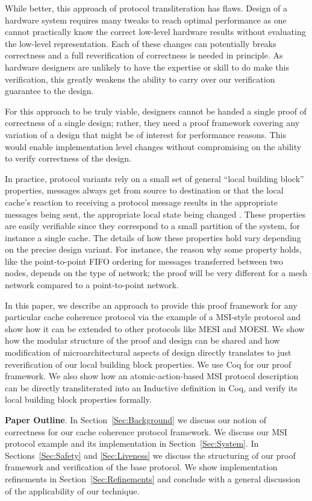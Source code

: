 While better, this approach of protocol transliteration has
flaws. Design of a hardware system requires many tweaks to reach
optimal performance as one cannot practically know the correct
low-level hardware results without evaluating the low-level
representation.  Each of these changes can potentially breaks
correctness and a full reverification of correctness is needed in
principle. As hardware designers are unlikely to have the expertise or
skill to do make this verification, this greatly weakens the ability
to carry over our verification guarantee to the design.

For this approach to be truly viable, designers cannot be handed a
single proof of correctness of a single design; rather, they need a
proof framework covering any variation of a design that might be of
interest for performance reasons. This would enable implementation
level changes without compromising on the ability to verify
correctness of the design.

In practice, protocol variants rely on a small set of general ``local
building block'' properties, \eg{} messages always get from source to
destination or that the local cache's reaction to receiving a protocol
message results in the appropriate messages being sent, the
appropriate local state being changed \etc{}.  These properties are
easily verifiable since they correspond to a small partition of the
system, for instance a single cache.  The details of how these
properties hold vary depending on the precise design variant. For
instance, the reason why some property holds, like the point-to-point
FIFO ordering for messages transferred between two nodes, depends on
the type of network; the proof will be very different for a mesh
network compared to a point-to-point network.

In this paper, we describe an approach to provide this proof framework
for any particular cache coherence protocol via the example of a
MSI-style protocol and show how it can be extended to other protocols
like MESI and MOESI. We show how the modular structure of the proof
and design can be shared and how modification of microarchitectural
aspects of design directly translates to just reverification of our
local building block properties. We use Coq for our proof
framework. We also show how an atomic-action-based MSI protocol
description can be directly transliterated into an Inductive
definition in Coq, and verify its local building block properties
formally.

\noindent\textbf{Paper Outline}. In Section~\ref{Sec:Background} we
discuss our notion of correctness for our cache coherence protocol
framework. We discuss our MSI protocol example and its implementation
in Section~\ref{Sec:System}. In Sections~\ref{Sec:Safety} and
\ref{Sec:Liveness} we discuss the structuring of our proof framework and
verification of the base protocol. We show implementation refinements
in Section~\ref{Sec:Refinements} and conclude with a general
discussion of the applicability of our technique.
